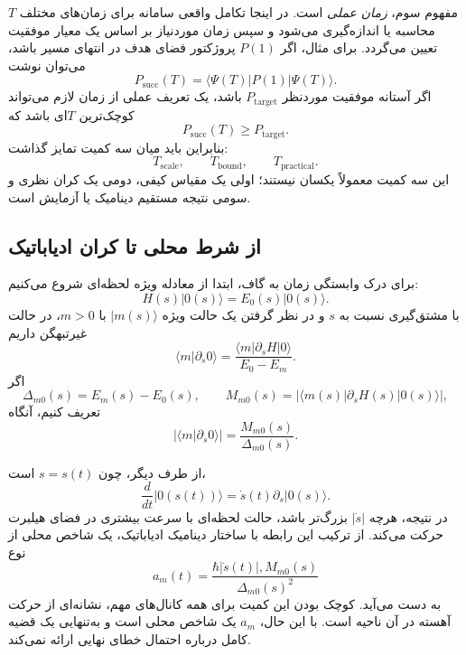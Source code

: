 مفهوم سوم، \textit{زمان عملی} است. در اینجا تکامل واقعی سامانه برای
زمان‌های مختلف $T$ محاسبه یا اندازه‌گیری می‌شود و سپس زمان موردنیاز
بر اساس یک معیار موفقیت تعیین می‌گردد. برای مثال، اگر $P(1)$
پروژکتور فضای هدف در انتهای مسیر باشد، می‌توان نوشت
\begin{equation}
	P_{\mathrm{succ}}(T)=
	\langle\Psi(T)|P(1)|\Psi(T)\rangle.
	\label{eq:success-vs-time}
\end{equation}
اگر آستانه موفقیت موردنظر $P_{\mathrm{target}}$ باشد، یک تعریف
عملی از زمان لازم می‌تواند کوچک‌ترین $T$ای باشد که
\begin{equation}
	P_{\mathrm{succ}}(T)\geq P_{\mathrm{target}}.
	\label{eq:practical-runtime}
\end{equation}
بنابراین باید میان سه کمیت تمایز گذاشت:
\begin{equation}
	T_{\mathrm{scale}},
	\qquad
	T_{\mathrm{bound}},
	\qquad
	T_{\mathrm{practical}}.
\end{equation}
این سه کمیت معمولاً یکسان نیستند؛ اولی یک مقیاس کیفی، دومی یک
کران نظری و سومی نتیجه مستقیم دینامیک یا آزمایش است.

\subsection{از شرط محلی تا کران ادیاباتیک}

برای درک وابستگی زمان به گاف، ابتدا از معادله ویژه لحظه‌ای شروع
می‌کنیم:
\begin{equation}
	H(s)|0(s)\rangle=E_0(s)|0(s)\rangle.
\end{equation}
با مشتق‌گیری نسبت به $s$ و در نظر گرفتن یک حالت ویژه
$|m(s)\rangle$ با $m>0$، در حالت غیرتبهگن داریم
\begin{equation}
	\langle m|\partial_s0\rangle =
	\frac{\langle m|\partial_sH|0\rangle}
	{E_0-E_m}.
	\label{eq:runtime-eigenstate-derivative}
\end{equation}
اگر
\begin{equation}
	\Delta_{m0}(s)=E_m(s)-E_0(s),
	\qquad
	M_{m0}(s)=
	\left|
	\langle m(s)|\partial_sH(s)|0(s)\rangle
	\right|,
\end{equation}
تعریف کنیم، آنگاه
\begin{equation}
	\left|\langle m|\partial_s0\rangle\right|=
	\frac{M_{m0}(s)}{\Delta_{m0}(s)}.
	\label{eq:eigenstate-sensitivity}
\end{equation}

از طرف دیگر، چون $s=s(t)$ است،
\begin{equation}
	\frac{d}{dt}|0(s(t))\rangle=
	\dot{s}(t) \partial_s|0(s)\rangle.
\end{equation}
در نتیجه، هرچه $|\dot{s}|$ بزرگ‌تر باشد، حالت لحظه‌ای با سرعت
بیشتری در فضای هیلبرت حرکت می‌کند. از ترکیب این رابطه با ساختار
دینامیک ادیاباتیک، یک شاخص محلی از نوع
\begin{equation}
	a_m(t)=
	\frac{
		\hbar |\dot{s}(t)|,M_{m0}(s)
	}{
		\Delta_{m0}(s)^2
	}
	\label{eq:runtime-local-indicator}
\end{equation}
به دست می‌آید. کوچک بودن این کمیت برای همه کانال‌های مهم، نشانه‌ای
از حرکت آهسته در آن ناحیه است. با این حال، $a_m$ یک شاخص محلی است
و به‌تنهایی یک قضیه کامل درباره احتمال خطای نهایی ارائه نمی‌کند.


